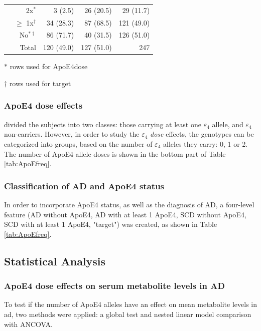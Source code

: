 \documentclass{amsart}
\begin{document}
\begin{table}
\begin{threeparttable}
\begin{tabular}{crrrr}
                                        & 2x$^\ast$            & 3 (2.5)    & 26 (20.5)  & 29 (11.7)   \\
                                        & $\geq$ 1x$ ^\dagger$ & 34 (28.3)  & 87 (68.5)  & 121 (49.0)  \\
                                        & No$^{\ast\dagger}$     & 86 (71.7)  & 40 (31.5)  & 126 (51.0)  \\ \midrule
    \multicolumn{2}{r}{Total}                                                & 120 (49.0)       & 127 (51.0)       & 247         \\ \bottomrule
  \end{tabular}
  \begin{tablenotes}
    \item[$\ast$] rows used for ApoE4dose
    \item[$\dagger$] rows used for target 
  \end{tablenotes}
\end{threeparttable}
\end{table}

\subsubsection{ApoE4 dose effects}
\citeauthor{deLeeuw2017Blood-basedDisease} divided the subjects into two classes: those carrying at least one $\varepsilon_4$ allele, and $\varepsilon_4$ non-carriers. However, in order to study the $\varepsilon_4$ \textit{dose} effects, the genotypes can be categorized into groups, based on the number of $\varepsilon_4$ alleles they carry: 0, 1 or 2. The number of ApoE4 allele doses is shown in the bottom part of Table \ref{tab:ApoEfreq}.

\subsubsection{Classification of AD and ApoE4 status}
In order to incorporate ApoE4 status, as well as the diagnosis of AD, a four-level feature (AD without ApoE4, AD with at least 1 ApoE4, SCD without ApoE4, SCD with at least 1 ApoE4, "target") was created, as shown in Table \ref{tab:ApoEfreq}.

\subsection{Statistical Analysis} \label{stats}
\subsubsection{ApoE4 dose effects on serum metabolite levels in AD} \label{rq1}
To test if the number of ApoE4 alleles have an effect on mean metabolite levels in \acrshort{ad}, two methods were applied: a global test and nested linear model comparison with ANCOVA.
\end{document}
